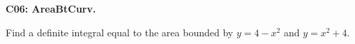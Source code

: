 \documentclass[12pt]{article}
\newcommand{\<}{\left\langle}
\renewcommand{\>}{\right\rangle}
\newcommand{\exerciseHeader}[4]{


  \vspace{0.5em}
  \textbf{#2}
  \vspace{0.5em}

}
\begin{document}
\begin{multicols}{2}
%

%

%

%

%

%

\exerciseHeader{2017 July 14}{C06: AreaBtCurv. }{
Express an area between curves as a definite integral.
}{Extra2}

Find a definite integral equal to the area bounded by
\(y=4-x^2\) and \(y=x^2+4\).



%

%

%


\end{multicols}
\end{document}
